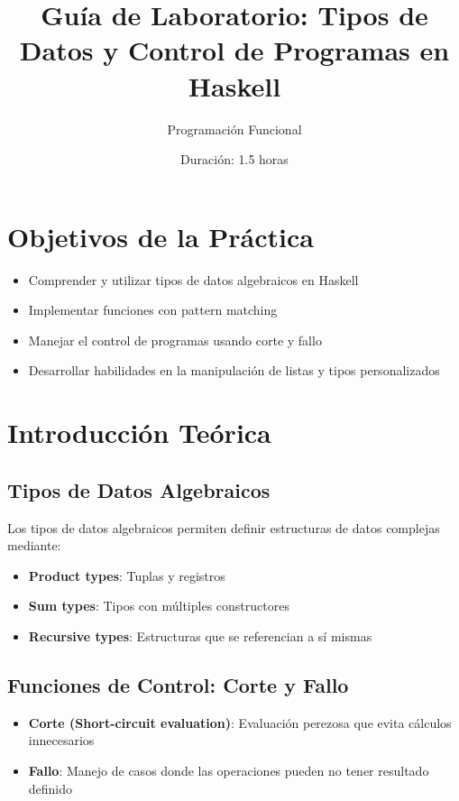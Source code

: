 \documentclass[12pt]{article}
\begin{document}
\title{Guía de Laboratorio: Tipos de Datos y Control de Programas en Haskell}
\author{Programación Funcional}
\date{Duración: 1.5 horas}
\maketitle

\section*{Objetivos de la Práctica}
\begin{itemize}
    \item Comprender y utilizar tipos de datos algebraicos en Haskell
    \item Implementar funciones con pattern matching
    \item Manejar el control de programas usando corte y fallo
    \item Desarrollar habilidades en la manipulación de listas y tipos personalizados
\end{itemize}

\section{Introducción Teórica}

\subsection{Tipos de Datos Algebraicos}
Los tipos de datos algebraicos permiten definir estructuras de datos complejas mediante:
\begin{itemize}
    \item \textbf{Product types}: Tuplas y registros
    \item \textbf{Sum types}: Tipos con múltiples constructores
    \item \textbf{Recursive types}: Estructuras que se referencian a sí mismas
\end{itemize}

\subsection{Funciones de Control: Corte y Fallo}
\begin{itemize}
    \item \textbf{Corte (Short-circuit evaluation)}: Evaluación perezosa que evita cálculos innecesarios
    \item \textbf{Fallo}: Manejo de casos donde las operaciones pueden no tener resultado definido
\end{itemize}
\end{document}
